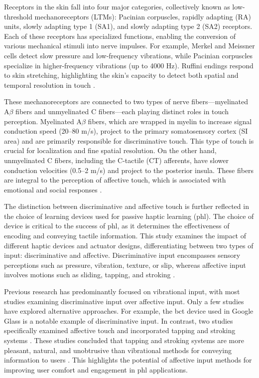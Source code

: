 Receptors in the skin fall into four major categories, collectively known as low-threshold mechanoreceptors (LTMs): Pacinian corpuscles, rapidly adapting (RA) units, slowly adapting type 1 (SA1), and slowly adapting type 2 (SA2) receptors. Each of these receptors has specialized functions, enabling the conversion of various mechanical stimuli into nerve impulses. For example, Merkel and Meissner cells detect slow pressure and low-frequency vibrations, while Pacinian corpuscles specialize in higher-frequency vibrations (up to 4000 Hz). Ruffini endings respond to skin stretching, highlighting the skin's capacity to detect both spatial and temporal resolution in touch \cite{Fang2022a, Fang2023, ackerley2016touch, mcglone2014discriminative}.

These mechanoreceptors are connected to two types of nerve fibers—myelinated A$\beta$ fibers and unmyelinated C fibers—each playing distinct roles in touch perception. Myelinated A$\beta$ fibers, which are wrapped in myelin to increase signal conduction speed (20–80 m/s), project to the primary somatosensory cortex (SI area) and are primarily responsible for discriminative touch. This type of touch is crucial for localization and fine spatial resolution. On the other hand, unmyelinated C fibers, including the C-tactile (CT) afferents, have slower conduction velocities (0.5–2 m/s) and project to the posterior insula. These fibers are integral to the perception of affective touch, which is associated with emotional and social responses \cite{Fang2022a, Fang2023, ackerley2016touch, mcglone2014discriminative}.

The distinction between discriminative and affective touch is further reflected in the choice of learning devices used for passive haptic learning (\gls{phl}). The choice of device is critical to the success of \gls{phl}, as it determines the effectiveness of encoding and conveying tactile information. This study examines the impact of different haptic devices and actuator designs, differentiating between two types of input: discriminative and affective. Discriminative input encompasses sensory perceptions such as pressure, vibration, texture, or slip, whereas affective input involves motions such as sliding, tapping, and stroking \cite{Fang2023}.

Previous research has predominantly focused on vibrational input, with most studies examining discriminative input over affective input. Only a few studies have explored alternative approaches. For example, the \gls{bct} device used in Google Glass \cite{Seim2016a} is a notable example of discriminative input. In contrast, two studies specifically examined affective touch and incorporated tapping and stroking systems \cite{Fang2020, Fang2023}. These studies concluded that tapping and stroking systems are more pleasant, natural, and unobtrusive than vibrational methods for conveying information to users \cite{Fang2022a, Fang2023}. This highlights the potential of affective input methods for improving user comfort and engagement in \gls{phl} applications.


